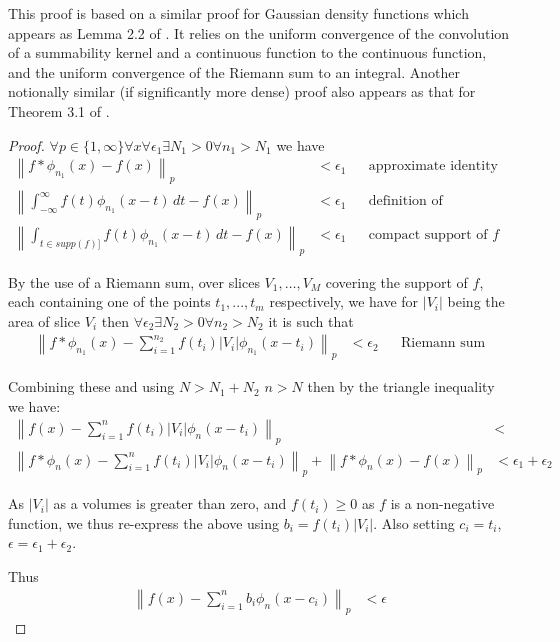 \documentclass{article} %
\newcommand{\textcite}{\cite}
\begin{document}
This proof is based on a similar proof for Gaussian density functions which appears as Lemma 2.2 of \textcite{bacharoglou2010approximation}.
It relies on the uniform convergence of the convolution of a summability kernel and a continuous function to the continuous function, and the uniform convergence of the Riemann sum to an integral.
Another notionally similar (if significantly more dense) proof also appears as that for Theorem 3.1 of \textcite{NESTORIDIS20111783}.


\begin{proof}
	$\forall p \in \lbrace 1,\infty \rbrace \forall x  \forall \epsilon_1 \exists N_1>0 \forall n_1>N_1$ we have
	\begin{align}
	\left\| f \ast \phi_{n_1}(x) - f(x) \right\|_p &< \epsilon_1 && \text{approximate identity property} \\
	\left\| \int_{-\infty}^\infty f(t)\phi_{n_1}(x-t) \, dt - f(x)\right\|_p &< \epsilon_1 && \text{definition of convolution} \\
	\left\| \int_{t \in supp(f)]} f(t)\phi_{n_1}(x-t) \, dt - f(x)\right\|_p &< \epsilon_1 && \text{compact support of $f$}
	\end{align}
	
	By the use of a Riemann sum, over slices $V_1,\ldots, V_M$ covering the support of $f$, each containing one of the points $t_1,...,t_m$ respectively,
	we have for $|V_i|$ being the area of slice $V_i$ then
	$\forall \epsilon_2 \exists N_2>0 \forall n_2>N_2$ it is such that 
	\begin{align}
		\left\| f \ast \phi_{n_1}(x) - \sum^{n_2}_{i=1} f(t_i)|V_i|\phi_{n_1}(x-t_i) \right\|_p &< \epsilon_2 && \text{Riemann sum} 
	\end{align}
	
	Combining these and using $N > N_1 + N_2$ $n>N$ then by the triangle inequality we have:
	\begin{align}
	\left\| f(x) - \sum^{n}_{i=1} f(t_i)|V_i|\phi_n(x-t_i) \right\|_p &<  &&  \\
	\left\| f \ast \phi_n(x) - \sum^{n}_{i=1} f(t_i)|V_i|\phi_n(x-t_i) \right\|_p 
	+  \left\| f \ast \phi_n(x) - f(x) \right\|_p &< \epsilon_1 + \epsilon_2 
	\end{align}
	
	As $|V_i|$ as a volumes is greater than zero, and $f(t_i) \ge 0$ as $f$ is a non-negative function, we thus re-express the above using $b_i=f(t_i)|V_i|$.
	Also setting $c_i=t_i$, $\epsilon=\epsilon_1+\epsilon_2$.
	
	Thus 
	\begin{align}
	\left\| f(x) - \sum^{n}_{i=1} b_i \phi_n(x-c_i) \right\|_p &<  \epsilon
	\end{align}
\end{proof}
\end{document}
